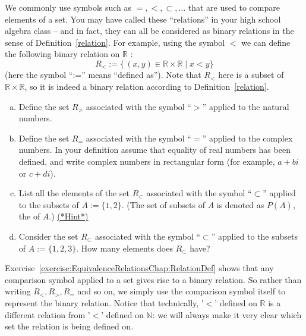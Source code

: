 We commonly use symbols  such as $=, < , \subset, \ldots $  that are used to compare elements of a set. You may have called these ``relations'' in your high school algebra class -- and in fact, they can all be considered as binary relations in the sense of Definition~\ref{relation}.
For example, using the symbol $<$ we can define the following binary relation on ${\mathbb R}$ :
\[ R_<  := \{\, (x,y) \in \mathbb{R} \times \mathbb{R} \mid x < y \}  \]
(here the symbol ``:='' means ``defined as'').  Note that $ R_<$ here is a subset of $\mathbb{R} \times \mathbb{R}$, so it is indeed a binary relation according to Definition~\ref{relation}. 


\begin{exer} \label{exercise:EquivalenceRelationsChap:RelationDef}
\begin{enumerate}[(a)]
 \item  
 Define the set $R_>$ associated with the symbol ``$>$'' applied to the natural numbers.
 \item  
 Define the set $R_=$ associated with the symbol ``$=$'' applied to the complex numbers. In your definition assume that equality of real numbers has been defined, and write complex numbers in rectangular form (for example, $a + bi$ or $c + di$).
 \item  
 List all the elements of the set $R_\subset$ associated with the symbol ``$\subset$'' applied to the subsets of $A := \{1,2\}$. (The set of subsets of $A$ is denoted as $P(A)$, the  of $A$.)
 \hyperref[secEqRelChapHints]{(*Hint*)}
 \item  
Consider the set $R_\subset$ associated with the symbol ``$\subset$'' applied to the subsets of $A := \{1,2,3\}$. How many elements does $R_\subset$ have?
 \end{enumerate}
 \end{exer}
 
Exercise~\ref{exercise:EquivalenceRelationsChap:RelationDef} shows that any comparison symbol applied to a set gives rise to a binary relation. So rather than writing $R_<, R_>, R_=$ and so on, we simply use the comparison symbol itself to represent the binary relation.  Notice that technically, '$<$' defined on $\mathbb{R}$ is a different relation from '$<$' defined on $\mathbb{N}$: we will always make it very clear which set the relation is being defined on.

